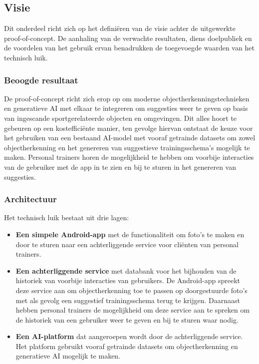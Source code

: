\subsection{Visie}
\label{subsec:visie}
Dit onderdeel richt zich op het defini\"eren van de visie achter de uitgewerkte proof-of-concept.
De aanhaling van de verwachte resultaten, diens doelpubliek en de voordelen van het gebruik ervan benadrukken de toegevoegde waarden van het technisch luik.

\subsubsection{Beoogde resultaat}
\label{subsubsec:doel-van-de-proof-of-concept}
De proof-of-concept richt zich erop op om moderne objectherkenningstechnieken en generatieve AI met elkaar te integreren om suggesties weer te geven op basis van ingescande sportgerelateerde objecten en omgevingen.
Dit alles hoort te gebeuren op een kosteffici\"ente manier, ten gevolge hiervan ontstaat de keuze voor het gebruiken van een bestaand AI-model met vooraf getrainde datasets om zowel objectherkenning en het genereren van suggestieve trainingsschema's mogelijk te maken.
Personal trainers horen de mogelijkheid te hebben om voorbije interacties van de gebruiker met de app in te zien en bij te sturen in het genereren van suggesties.

\subsubsection{Architectuur}
\label{subsubsec:architectuur}
Het technisch luik bestaat uit drie lagen:
\begin{itemize}
    \item \textbf{Een simpele Android-app} met de functionaliteit om foto's te maken en door te sturen naar een achterliggende service voor cli\"enten van personal trainers.
    \item \textbf{Een achterliggende service} met databank voor het bijhouden van de historiek van voorbije interacties van gebruikers.
    De Android-app spreekt deze service aan om objectherkenning toe te passen op doorgestuurde foto's met als gevolg een suggestief trainingsschema terug te krijgen.
    Daarnaast hebben personal trainers de mogelijkheid om deze service aan te spreken om de historiek van een gebruiker weer te geven en bij te sturen waar nodig.
    \item \textbf{Een AI-platform} dat aangeroepen wordt door de achterliggende service.
    Het platform gebruikt vooraf getrainde datasets om objectherkenning en generatieve AI mogelijk te maken.
\end{itemize}

